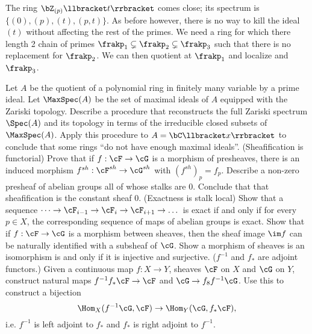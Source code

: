 \begin{homework}[e]
\begin{prf}
		The ring $\bZ_{(p)}\llbracket t\rrbracket$ comes close; its spectrum is $\{(0), (p), (t), (p,t)\}$. As before however, there is no way to kill the ideal $(t)$ without affecting the rest of the primes. We need a ring for which there length 2 chain of primes $\frakp_1 \subsetneq \frakp_2 \subsetneq \frakp_3$ such that there is no replacement for $\frakp_2$. We can then quotient at $\frakp_1$ and localize and $\frakp_3$.	
	\end{prf}
	\prob Let $A$ be the quotient of a polynomial ring in finitely many variable by a prime ideal. Let $\MaxSpec(A)$ be the set of maximal ideals of $A$ equipped with the Zariski topology. Describe a procedure that reconstructs the full Zariski spectrum $\Spec(A)$ and its topology in terms of the irreducible closed subsets of $\MaxSpec(A)$. Apply this procedure to $A = \bC\llbracket x \rrbracket$ to conclude that some rings ``do not have enough maximal ideals''.
	\prob (Sheafification is functorial) Prove that if $f:\cF \to \cG$ is a morphism of presheaves, there is an induced morphism $f^{sh}:\cF^{sh}\to \cG^{sh}$ with $(f^{sh})_p = f_p$.
	\prob Describe a non-zero presheaf of abelian groups all of whose stalks are 0. Conclude that that sheafification is the constant sheaf 0.
	\prob (Exactness is stalk local) Show that a sequence $\dots \to \cF_{i-1} \to \cF_{i} \to \cF_{i+1} \to \dots$ is exact if and only if for every $p \in X$, the corresponding sequence of maps of abelian groups is exact.
	\prob Show that if $f:\cF\to \cG$ is a morphism between sheaves, then the sheaf image $\im f$ can be naturally identified with a subsheaf of $\cG$.
	\prob Show a morphism of sheaves is an isomorphism is and only if it is injective and surjective.
	\prob ($f^{-1}$ and $f_*$ are adjoint functors.) Given a continuous map $f:X\to Y$, sheaves $\cF$ on $X$ and $\cG$ on $Y$, construct natural maps $f^{-1}f_*\cF\to \cF$ and $\cG \to f_8f^{-1}\cG$. Use this to construct a bijection
	\[
	\Hom_X(f^{-1}\cG, \cF) \to \Hom_Y(\cG, f_*\cF),
	\]
	i.e. $f^{-1}$ is left adjoint to $f_ *$ and $f_*$ is right adjoint to $f^{-1}$.


\end{homework}

